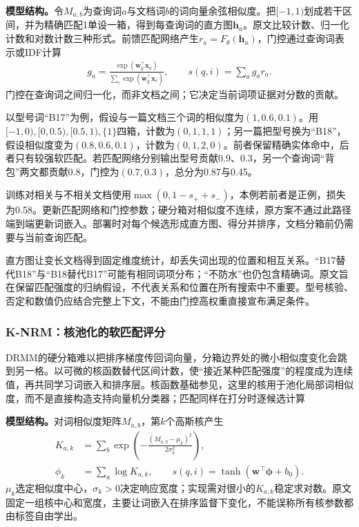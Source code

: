 \textbf{模型结构。}令$M_{a,b}$为查询词$a$与文档词$b$的词向量余弦相似度。把$[-1,1)$划成若干区间，并为精确匹配1单设一箱，得到每查询词的直方图$\bm h_a$。原文比较计数、归一化计数和对数计数三种形式。前馈匹配网络产生$r_a=F_\theta(\bm h_a)$，门控通过查询词表示或IDF计算
\begin{equation}
 \begin{split}
 g_a=\frac{\exp(\bm w_g^\top\bm x_a)}
 {\sum_c\exp(\bm w_g^\top\bm x_c)},\qquad
 s(q,i)=\sum_a g_a r_a .
 \end{split}
 \label{eq:rs-search-drmm}
\end{equation}
门控在查询词之间归一化，而非文档之间；它决定当前词项证据对分数的贡献。

以型号词“B17”为例，假设与一篇文档三个词的相似度为$(1,0.6,0.1)$。用$[-1,0),[0,0.5),[0.5,1),\{1\}$四箱，计数为$(0,1,1,1)$；另一篇把型号换为“B18”，假设相似度变为$(0.8,0.6,0.1)$，计数为$(0,1,2,0)$。前者保留精确实体命中，后者只有较强软匹配。若匹配网络分别输出型号贡献0.9、0.3，另一个查询词“背包”两文都贡献0.8，门控为$(0.7,0.3)$，总分为0.87与0.45。

训练对相关与不相关文档使用$\max(0,1-s_++s_-)$，本例若前者是正例，损失为0.58。更新匹配网络和门控参数；硬分箱对相似度不连续，原方案不通过此路径端到端更新词嵌入。部署时对每个候选形成直方图、得分并排序，文档分箱前仍需要与当前查询匹配。

直方图让变长文档得到固定维度统计，却丢失词出现的位置和相互关系。“B17替代B18”与“B18替代B17”可能有相同词项分布；“不防水”也仍包含精确词。原文旨在保留匹配强度的归纳假设，不代表关系和位置在所有搜索中不重要。型号核验、否定和数值仍应结合完整上下文，不能由门控高权重直接宣布满足条件。

\Needspace{100mm}
\subsubsection{K-NRM：核池化的软匹配评分}
\label{sec:rs-search-knrm}

DRMM的硬分箱难以把排序梯度传回词向量，分箱边界处的微小相似度变化会跳到另一格。以可微的核函数替代区间计数，使“接近某种匹配强度”的程度成为连续值，再共同学习词嵌入和排序层。核函数基础参见，这里的核用于池化局部词相似度，而不是直接构造支持向量机分类器；匹配同样在打分时逐候选计算

\textbf{模型结构。}对词相似度矩阵$M_{a,b}$，第$k$个高斯核产生
\begin{equation}
 \begin{split}
 K_{a,k}&=\sum_b\exp\left(-\frac{(M_{a,b}-\mu_k)^2}{2\sigma_k^2}\right),\\
 \phi_k&=\sum_a\log K_{a,k},\qquad
 s(q,i)=\tanh(\bm w^\top\bm\phi+b_0).
 \end{split}
 \label{eq:rs-search-knrm}
\end{equation}
$\mu_k$选定相似度中心，$\sigma_k>0$决定响应宽度；实现需对很小的$K_{a,k}$稳定求对数。原文固定一组核中心和宽度，主要让词嵌入在排序监督下变化，不能误称所有核参数都由标签自由学出。

